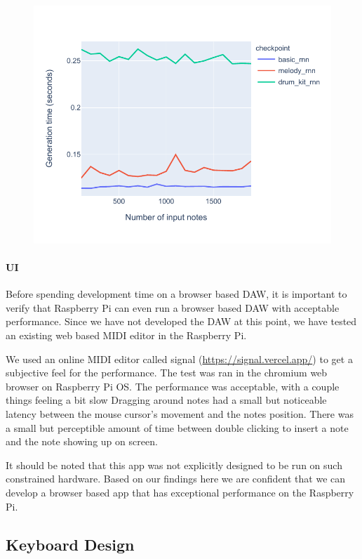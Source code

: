 \begin{figure}
  \includegraphics[width=\linewidth]{image/perfwrtnotes.pdf}
  \label{fig:pwrtnotes}
\end{figure}

\paragraph{UI} Before spending development time on a browser based DAW, it is important to
verify that Raspberry Pi can even run a browser based DAW with acceptable performance.
Since we have not developed the DAW at this point, we have tested an existing web based
MIDI editor in the Raspberry Pi.

We used an online MIDI editor called signal (\url{https://signal.vercel.app/}) to get a
subjective feel for the performance. The test was ran in the chromium web browser on
Raspberry Pi OS. The performance was acceptable, with a couple things feeling a bit slow
Dragging around notes had a small but noticeable latency between the mouse cursor's
movement and the notes position. There was a small but perceptible amount of time between
double clicking to insert a note and the note showing up on screen.

It should be noted that this app was not explicitly designed to be run on such constrained
hardware. Based on our findings here we are confident that we can develop a browser based
app that has exceptional performance on the Raspberry Pi.


\subsection{Keyboard Design}
